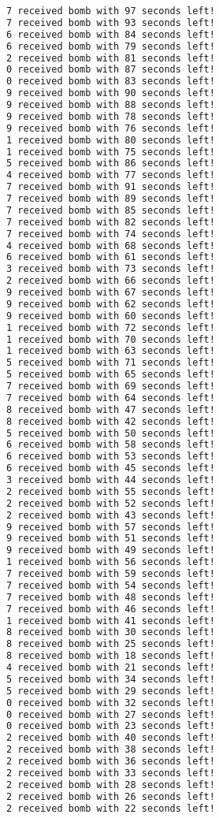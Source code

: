 \documentclass{article}
\begin{document}
\begin{lstlisting}[language=bash]
7 received bomb with 97 seconds left!
7 received bomb with 93 seconds left!
6 received bomb with 84 seconds left!
6 received bomb with 79 seconds left!
2 received bomb with 81 seconds left!
0 received bomb with 87 seconds left!
0 received bomb with 83 seconds left!
9 received bomb with 90 seconds left!
9 received bomb with 88 seconds left!
9 received bomb with 78 seconds left!
9 received bomb with 76 seconds left!
1 received bomb with 80 seconds left!
1 received bomb with 75 seconds left!
5 received bomb with 86 seconds left!
4 received bomb with 77 seconds left!
7 received bomb with 91 seconds left!
7 received bomb with 89 seconds left!
7 received bomb with 85 seconds left!
7 received bomb with 82 seconds left!
7 received bomb with 74 seconds left!
4 received bomb with 68 seconds left!
6 received bomb with 61 seconds left!
3 received bomb with 73 seconds left!
2 received bomb with 66 seconds left!
9 received bomb with 67 seconds left!
9 received bomb with 62 seconds left!
9 received bomb with 60 seconds left!
1 received bomb with 72 seconds left!
1 received bomb with 70 seconds left!
1 received bomb with 63 seconds left!
5 received bomb with 71 seconds left!
5 received bomb with 65 seconds left!
7 received bomb with 69 seconds left!
7 received bomb with 64 seconds left!
8 received bomb with 47 seconds left!
8 received bomb with 42 seconds left!
5 received bomb with 50 seconds left!
6 received bomb with 58 seconds left!
6 received bomb with 53 seconds left!
6 received bomb with 45 seconds left!
3 received bomb with 44 seconds left!
2 received bomb with 55 seconds left!
2 received bomb with 52 seconds left!
2 received bomb with 43 seconds left!
9 received bomb with 57 seconds left!
9 received bomb with 51 seconds left!
9 received bomb with 49 seconds left!
1 received bomb with 56 seconds left!
7 received bomb with 59 seconds left!
7 received bomb with 54 seconds left!
7 received bomb with 48 seconds left!
7 received bomb with 46 seconds left!
1 received bomb with 41 seconds left!
8 received bomb with 30 seconds left!
8 received bomb with 25 seconds left!
8 received bomb with 18 seconds left!
4 received bomb with 21 seconds left!
5 received bomb with 34 seconds left!
5 received bomb with 29 seconds left!
0 received bomb with 32 seconds left!
0 received bomb with 27 seconds left!
0 received bomb with 23 seconds left!
2 received bomb with 40 seconds left!
2 received bomb with 38 seconds left!
2 received bomb with 36 seconds left!
2 received bomb with 33 seconds left!
2 received bomb with 28 seconds left!
2 received bomb with 26 seconds left!
2 received bomb with 22 seconds left!

\end{lstlisting}
\end{document}
